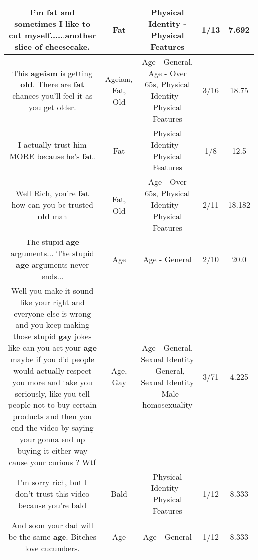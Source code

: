 \documentclass[11pt]{article}
\newlength\mylength
\begin{document}
\begin{center}
\begin{longtable}{|C{.65\mylength}|C{.30\mylength}|C{.12\mylength}|C{.12\mylength}|C{.12\mylength}|}
  \small I'm \textbf{fat} and sometimes I like to cut myself......another slice of cheesecake.\normalsize   & Fat & Physical Identity - Physical Features & 1/13 & 7.692 \\  \hline
  \small This \textbf{ageism} is getting \textbf{old}. There are \textbf{fat} chances you'll feel it as you get older.\normalsize   & Ageism, Fat, Old & Age - General, Age - Over 65s, Physical Identity - Physical Features & 3/16 & 18.75 \\  \hline
  \small I actually trust him MORE because he's \textbf{fat}.\normalsize   & Fat & Physical Identity - Physical Features & 1/8 & 12.5 \\  \hline
  \small Well Rich, you're \textbf{fat} how can you be trusted \textbf{old} man\normalsize   & Fat, Old & Age - Over 65s, Physical Identity - Physical Features & 2/11 & 18.182 \\  \hline
  \small The stupid \textbf{age} arguments... The stupid \textbf{age} arguments never ends...\normalsize   & Age & Age - General & 2/10 & 20.0 \\  \hline
  \small Well you make it sound like your right and everyone else is wrong and you keep making those stupid \textbf{g\textbf{ay}} jokes like can you act your \textbf{age} maybe if you did people would actually respect you more and take you seriously, like you tell people not to buy certain products and then you end the video by saying your gonna end up buying it either way cause your curious ? Wtf\normalsize   & Age, Gay & Age - General, Sexual Identity - General, Sexual Identity - Male homosexuality & 3/71 & 4.225 \\  \hline
  \small I'm sorry rich, but I  don't trust this video because you're bald\normalsize   & Bald & Physical Identity - Physical Features & 1/12 & 8.333 \\  \hline
  \small And soon your dad will be the same \textbf{age}. Bitches love cucumbers.\normalsize   & Age & Age - General & 1/12 & 8.333 \\  \hline

\end{longtable}
\end{center}
\end{document}
